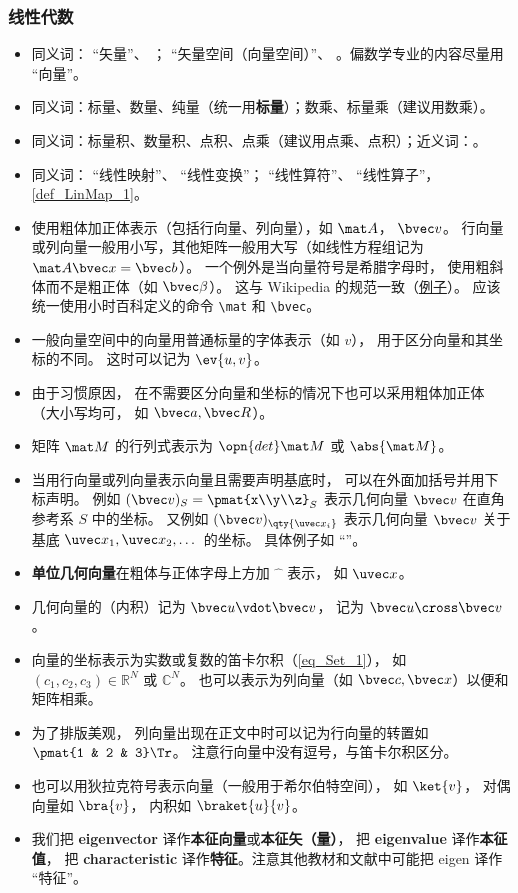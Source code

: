 \subsubsection{线性代数}
\begin{itemize}
\item 同义词： “矢量”、 ； “矢量空间（向量空间）”、 。偏数学专业的内容尽量用 “向量”。
\item 同义词：标量、数量、纯量（统一用\textbf{标量}）；数乘、标量乘（建议用数乘）。
\item 同义词：标量积、数量积、点积、点乘（建议用点乘、点积）；近义词：。
\item 同义词： “线性映射”、 “线性变换”； “线性算符”、 “线性算子”，\autoref{def_LinMap_1}。
\item 使用粗体加正体表示（包括行向量、列向量），如 $\mat A$， $\bvec v$。 行向量或列向量一般用小写，其他矩阵一般用大写（如线性方程组记为 $\mat A \bvec x = \bvec b$）。 一个例外是当向量符号是希腊字母时， 使用粗斜体而不是粗正体（如 $\bvec \beta$）。 这与 Wikipedia 的规范一致（\href{https://en.wikipedia.org/wiki/Angular_acceleration}{例子}）。 应该统一使用小时百科定义的命令 \verb`\mat` 和 \verb`\bvec`。
\item 一般向量空间中的向量用普通标量的字体表示（如 $v$）， 用于区分向量和其坐标的不同。 这时可以记为 $\ev{u, v}$。
\item 由于习惯原因， 在不需要区分向量和坐标的情况下也可以采用粗体加正体（大小写均可， 如 $\bvec a, \bvec R$）。
\item 矩阵 $\mat M$ 的行列式表示为 $\opn{det}\mat M$ 或 $\abs{\mat M}$。
\item 当用行向量或列向量表示向量且需要声明基底时， 可以在外面加括号并用下标声明。 例如 $(\bvec v)_S = \pmat{x\\y\\z}_S$ 表示几何向量 $\bvec v$ 在直角参考系 $S$ 中的坐标。 又例如 $(\bvec v)_{\qty{\uvec x_i}}$ 表示几何向量 $\bvec v$ 关于基底 $\uvec x_1, \uvec x_2, \dots$ 的坐标。 具体例子如 “”。
\item \textbf{单位几何向量}在粗体与正体字母上方加 $\hat{\phantom{x}}$ 表示， 如 $\uvec x$。
\item 几何向量的（内积）记为 $\bvec u \vdot \bvec v$， 记为 $\bvec u \cross \bvec v$。
\item 向量的坐标表示为实数或复数的笛卡尔积（\autoref{eq_Set_1}）， 如 $(c_1, c_2, c_3) \in  \mathbb R^N$ 或 $\mathbb C^N$。 也可以表示为列向量（如 $\bvec c, \bvec x$）以便和矩阵相乘。
\item 为了排版美观， 列向量出现在正文中时可以记为行向量的转置如 $\pmat{1 & 2 & 3}\Tr$。 注意行向量中没有逗号，与笛卡尔积区分。
\item 也可以用狄拉克符号表示向量（一般用于希尔伯特空间）， 如 $\ket{v}$， 对偶向量如 $\bra{v}$， 内积如 $\braket{u}{v}$。
\item 我们把 \textbf{eigenvector} 译作\textbf{本征向量}或\textbf{本征矢（量）}， 把 \textbf{eigenvalue} 译作\textbf{本征值}， 把 \textbf{characteristic} 译作\textbf{特征}。注意其他教材和文献中可能把 eigen 译作 “特征”。
\end{itemize}

